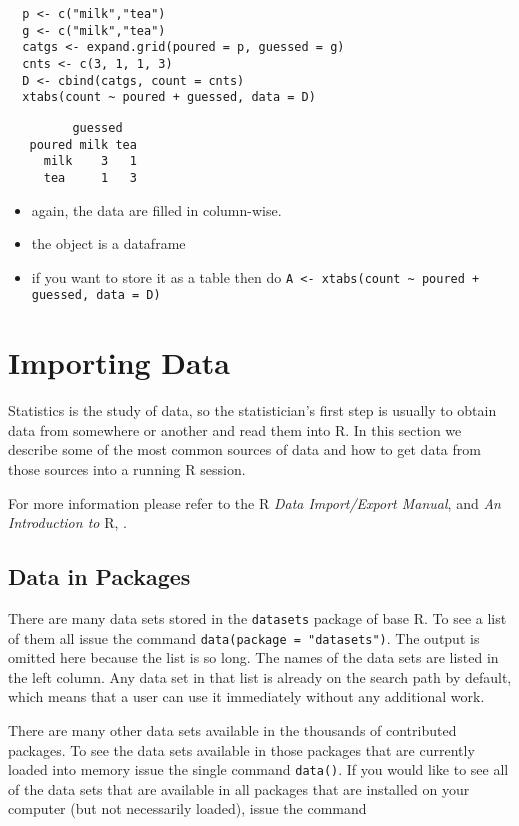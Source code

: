 \documentclass[captions=tableheading]{scrbook}
\begin{document}
\begin{verbatim}
  p <- c("milk","tea")
  g <- c("milk","tea")
  catgs <- expand.grid(poured = p, guessed = g)
  cnts <- c(3, 1, 1, 3)
  D <- cbind(catgs, count = cnts)
  xtabs(count ~ poured + guessed, data = D)
\end{verbatim}

\begin{verbatim}
         guessed
   poured milk tea
     milk    3   1
     tea     1   3
\end{verbatim}

\begin{itemize}
\item again, the data are filled in column-wise.
\item the object is a dataframe
\item if you want to store it as a table then do \texttt{A <- xtabs(count \textasciitilde{} poured + guessed, data = D)}
\end{itemize}
\section{Importing Data \label{sec:Importing-A-Data}}
\label{sec-5-2}


Statistics is the study of data, so the statistician's first step is usually to obtain data from somewhere or another and read them into \textsf{R}. In this section we describe some of the most common sources of data and how to get data from those sources into a running \textsf{R} session.

For more information please refer to the \textsf{R} \emph{Data Import/Export Manual}, \cite{rstatenv} and \emph{An Introduction to} \textsf{R}, \cite{Venables2010}.
\subsection{Data in Packages}
\label{sec-5-2-1}


There are many data sets stored in the \texttt{datasets} package of base \textsf{R}. To see a list of them all issue the command \texttt{data(package = "datasets")}. The output is omitted here because the list is so long. The names of the data sets are listed in the left column. Any data set in that list is already on the search path by default, which means that a user can use it immediately without any additional work. 

There are many other data sets available in the thousands of contributed packages. To see the data sets available in those packages that are currently loaded into memory issue the single command \texttt{data()}. If you would like to see all of the data sets that are available in all packages that are installed on your computer (but not necessarily loaded), issue the command 
\end{document}
